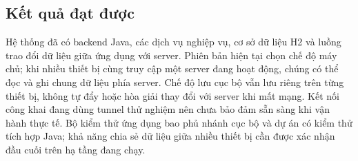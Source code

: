 \documentclass[../DoAn.tex]{subfiles}
\begin{document}
\subsection{Kết quả đạt được}
Hệ thống đã có backend Java, các dịch vụ nghiệp vụ, cơ sở dữ liệu H2 và luồng trao đổi dữ liệu giữa ứng dụng với server. Phiên bản hiện tại chọn chế độ máy chủ; khi nhiều thiết bị cùng truy cập một server đang hoạt động, chúng có thể đọc và ghi chung dữ liệu phía server. Chế độ lưu cục bộ vẫn lưu riêng trên từng thiết bị, không tự đẩy hoặc hòa giải thay đổi với server khi mất mạng. Kết nối công khai đang dùng tunnel thử nghiệm nên chưa bảo đảm sẵn sàng khi vận hành thực tế. Bộ kiểm thử ứng dụng bao phủ nhánh cục bộ và dự án có kiểm thử tích hợp Java; khả năng chia sẻ dữ liệu giữa nhiều thiết bị cần được xác nhận đầu cuối trên hạ tầng đang chạy.
\end{document}
